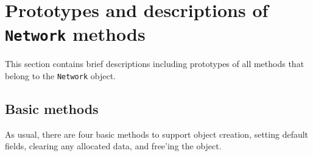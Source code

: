 \par
\section{Prototypes and descriptions of {\tt Network} methods}
\label{section:Network:proto}
\par
This section contains brief descriptions including prototypes
of all methods that belong to the {\tt Network} object.
\par
\subsection{Basic methods}
\label{subsection:Network:proto:basics}
\par
As usual, there are four basic methods to support object creation,
setting default fields, clearing any allocated data, and free'ing
the object.
\par
